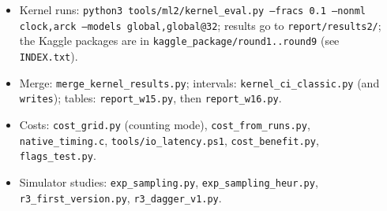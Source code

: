 \documentclass[10.5pt,a4paper]{article}
\newcommand{\code}[1]{\texttt{#1}}
\begin{document}
\begin{itemize}
\item Kernel runs: \code{python3 tools/ml2/kernel\_eval.py --fracs 0.1 --nonml clock,arck --models global,global@32}; results go to \code{report/results2/}; the Kaggle packages are in \code{kaggle\_package/round1..round9} (see \code{INDEX.txt}).
\item Merge: \code{merge\_kernel\_results.py}; intervals: \code{kernel\_ci\_classic.py} (and \code{writes}); tables: \code{report\_w15.py}, then \code{report\_w16.py}.
\item Costs: \code{cost\_grid.py} (counting mode), \code{cost\_from\_runs.py}, \code{native\_timing.c}, \code{tools/io\_latency.ps1}, \code{cost\_benefit.py}, \code{flags\_test.py}.
\item Simulator studies: \code{exp\_sampling.py}, \code{exp\_sampling\_heur.py}, \code{r3\_first\_version.py}, \code{r3\_dagger\_v1.py}.
\end{itemize}
\end{document}
